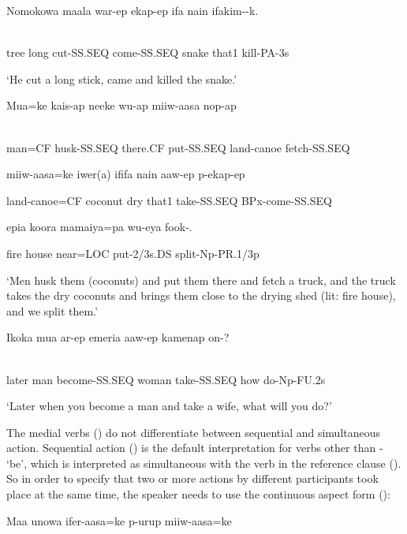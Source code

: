 \ea%
\label{ex:x1442}
\gll Nomokowa  maala  war-ep    ekap-ep  ifa  nain  ifakim--k. \\
      \\
\glt
\z

tree  long  cut-SS.SEQ  come-SS.SEQ  snake  that1  kill-PA-3s

`He cut a long stick, came and killed the snake.'

\ea%
\label{ex:x1444}
\gll Mua=ke  kais-ap  neeke  wu-ap  miiw-aasa  nop-ap  \\
      \\
\glt
\z

man=CF  husk-SS.SEQ  there.CF  put-SS.SEQ  land-canoe  fetch-SS.SEQ

miiw-aasa=ke  iwer(a)  ififa  nain  aaw-ep  p-ekap-ep

land-canoe=CF  coconut  dry  that1  take-SS.SEQ  BPx-come-SS.SEQ  

epia  koora  mamaiya=pa  wu-eya  fook-.

fire  house  near=LOC  put-2/3s.DS  split-Np-PR.1/3p

`Men husk them (coconuts) and put them there and fetch a truck, and the truck takes the dry coconuts and brings them close to the drying shed (lit: fire house), and we split them.'

\ea%
\label{ex:x1445}
\gll Ikoka  mua  ar-ep  emeria  aaw-ep  kamenap  on-? \\
      \\
\glt
\z

later  man  become-SS.SEQ  woman  take-SS.SEQ  how  do-Np-FU.2s

`Later when you become a man and take a wife, what will you do?'

The  medial verbs () do not differentiate between sequential and simultaneous action. Sequential action () is the default interpretation for verbs other than - `be', which is interpreted as simultaneous with the verb in the reference clause (). So in order to specify that two or more actions by different participants took place at the same time, the speaker needs to use the continuous aspect form ():

\ea%
\label{ex:x1502}
\gll Maa  unowa  ifer-aasa=ke  p-urup  miiw-aasa=ke  \\
      \\
\glt
\z

